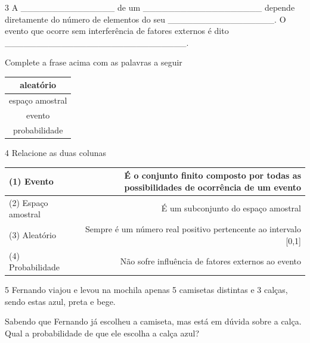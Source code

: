 {{{\begin{escolha}
{{{{{\begin{escolha}
\begin{escolha}
{\begin{q°}
{\begin{enumerate}
{{\num{3} A \_\_\_\_\_\_\_\_\_\_\_\_\_\_\_ de um
\_\_\_\_\_\_\_\_\_\_\_\_\_\_\_\_\_\_\_ depende diretamente do número de
elementos do seu \_\_\_\_\_\_\_\_\_\_\_\_\_\_\_\_\_. O evento que ocorre
sem interferência de fatores externos é dito
\_\_\_\_\_\_\_\_\_\_\_\_\_\_\_\_\_\_\_\_\_\_\_\_\_\_\_\_\_.

Complete a frase acima com as palavras a seguir

\begin{table}[]
\begin{tabular}{|c|}
\hline
aleatório \\ \hline
espaço amostral \\ \hline
evento \\ \hline
probabilidade \\ \hline
\end{tabular}
\end{table}


\num{4} Relacione as duas colunas

\begin{table}[]
\begin{tabular}{|l|r|}
\hline
(1) Evento & É o conjunto finito composto por todas as possibilidades de ocorrência de um evento \\ \hline
(2) Espaço amostral & É um subconjunto do espaço amostral \\ \hline
(3) Aleatório & Sempre é um número real positivo pertencente ao intervalo {[}0,1{]} \\ \hline
(4) Probabilidade & Não sofre influência de fatores externos ao evento \\ \hline
\end{tabular}
\end{table}


\num{5} Fernando viajou e levou na mochila apenas 5 camisetas distintas e 3
calças, sendo estas azul, preta e bege.

Sabendo que Fernando já escolheu a camiseta, mas está em dúvida sobre a
calça. Qual a probabilidade de que ele escolha a calça azul?



}}
\end{enumerate}}
\end{q°}}
\end{escolha}
\end{escolha}}}}}}
\end{escolha}}}}
